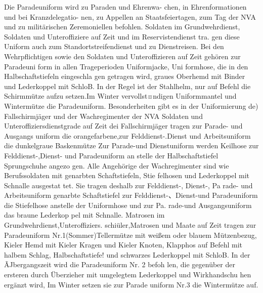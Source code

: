 

Die Paradeuniform wird zu Paraden und Ehrenwa-
chen, in Ehrenformationen und bei Kranzdelegatio-
nen, zu Appellen an Staatsfeiertagen, zum Tag der
NVA und zu militärischen Zeremoniellen befohlen.
Soldaten im Grundwehrdienst, Soldaten und Unteroffiziere auf Zeit und im Reservistendienst tra.
gen diese Uniform auch zum Standortstreifendienst
und zu Dienstreisen.
Bei den Wehrpflichtigen sowie den Soldaten und
Unteroffizieren auf Zeit gehören zur Paradeuni
form in allen Trageperioden Uniformjacke, Uni
formhose, die in den Halbschaftstiefeln eingeschla
gen getragen wird, graues Oberhemd mit Binder
und Lederkoppel mit SchloB. In der Regel ist der
Stahlhelm, nur auf Befehl die Schirmmütze aufzu
setzen.Im Winter vervollst¤ndigen Uniformmantel
und Wintermütze die Paradeuniform.
Besonderheiten gibt es in der Uniformierung de)
Fallschirmjäger und der Wachregimenter der NVA
Soldaten und Unteroffiziersdienstgrade auf Zeit dei
Fallschirmjäger tragen zur Parade- und Ausgangs
uniform die orangefarbene,zur Felddienst-.Dienst
und Arbeitsuniform die dunkelgraue Baskenmütze
Zur Parade-und Dienstuniform werden Keilhose
zur Felddienst-,Dienst- und Paradeuniform an
stelle der Halbschaftstiefel Sprungschuhe angezo
gen.
Alle Angehörige der Wachregimenter sind wie
Berufssoldaten mit genarbten Schaftstiefeln, Stie
felhosen und Lederkoppel mit Schnalle ausgestat
tet. Sie tragen deshalb zur Felddienst-, Dienst-, Pa
rade- und Arbeitsuniform genarbte Schaftstiefel
zur Felddienst-、Dienst-und Paradeuniform die
Stiefelhose anstelle der Uniformhose und zur Pa.
rade-und Ausgangsuniform das braune Lederkop
pel mit Schnalle.
Matrosen im Grundwehrdienst,Unteroffiziers.
schiüler,Matrosen und Maate auf Zeit tragen zur
Paradeuniform Nr.1(Sommer)Tellermütze mit
weißem oder blauem Mützenbezug, Kieler Hemd
mit Kieler Kragen und Kieler Knoten, Klapphos
auf Befehl mit halbem Schlag, Halbschaftstiefe!
und schwarzes Lederkoppel mit SchloB. In der
ÃJbergangszeit wird die Paradeuniform Nr. 2 befoh
len, die gegenüber der ersteren durch Überzieher
mit umgelegtem Lederkoppel und Wirkhandschu
hen ergänzt wird, Im Winter setzen sie zur Parade
uniform Nr.3 die Wintermütze auf.

